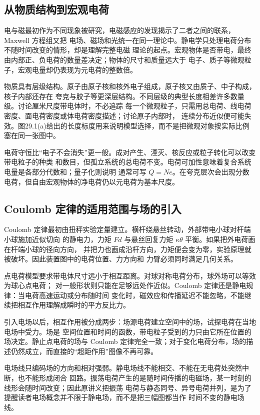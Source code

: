 \subsection*{从物质结构到宏观电荷}

电与磁最初作为不同现象被研究，电磁感应的发现揭示了二者之间的联系，Maxwell 方程组又把
电场、磁场和光统一在同一理论中。静电学只处理电荷分布不随时间改变的情形，却是理解完整电磁
理论的起点。宏观物体是否带电，最终由内部正、负电荷的数量差决定；物体的尺寸和质量远大于
电子、质子等微观粒子，宏观电量却仍表现为元电荷的整数倍。

物质具有层级结构。原子由原子核和核外电子组成，原子核又由质子、中子构成，核子内部还存在
夸克与胶子等更深层结构。不同层级的典型长度相差许多数量级。讨论厘米尺度带电体时，不必追踪
每一个微观粒子，只需用总电荷、线电荷密度、面电荷密度或体电荷密度描述；讨论原子内部时，
连续分布近似便可能失效。图29.1(a)给出的长度标度用来说明模型选择，而不是把微观对象按实际比例
塞在同一张图中。

电荷守恒比“电子不会消失”更一般。成对产生、湮灭、核反应或粒子转化可以改变带电粒子的种类
和数目，但孤立系统的总电荷不变。电荷可加性意味着复合系统电量是各部分代数和；量子化则说明
通常可写 $Q=Ne$。在夸克层次会出现分数电荷，但自由宏观物体的净电荷仍以元电荷为基本尺度。

\subsection*{Coulomb 定律的适用范围与场的引入}

Coulomb 定律最初由扭秤实验定量建立。横杆绕悬丝转动，外部带电小球对杆端小球施加近似切向
的静电力，力矩 $Fd$ 与悬丝回复力矩 $\kappa\theta$ 平衡。如果把外电荷画在杆端小球的径向方向，
并把力也画成沿杆方向，力矩便会变为零，实验原理就被破坏。因此装置图中的电荷位置、力方向和
力臂必须同时满足几何关系。

点电荷模型要求带电体尺寸远小于相互距离。对球对称电荷分布，球外场可以等效为球心点电荷；
对一般形状则只能在足够远处作近似。Coulomb 定律还是静电规律：当电荷高速运动或分布随时间
变化时，磁效应和传播延迟不能忽略，不能继续把相互作用理解成瞬时的平方反比力。

引入电场以后，相互作用被分成两步：场源电荷建立空间中的场，试探电荷在当地电场中受力。场是
空间位置和时间的函数，带电粒子受到的力只由它所在位置的场决定。静止点电荷的场与 Coulomb
定律完全一致；对于变化电荷分布，场的描述仍然成立，而直接的“超距作用”图像不再可靠。

电场线只编码场的方向和相对强弱。静电场线不能相交、不能在无电荷处突然中断，也不能形成闭合
回路。振荡电荷产生的是随时间传播的电磁场，某一时刻的线形会随时间改变；因此原讲义把振荡
电荷与静态同号、异号电荷并列，是为了提醒读者电场概念并不限于静电场，而不是把三幅图都当作
时间不变的静电场线。

